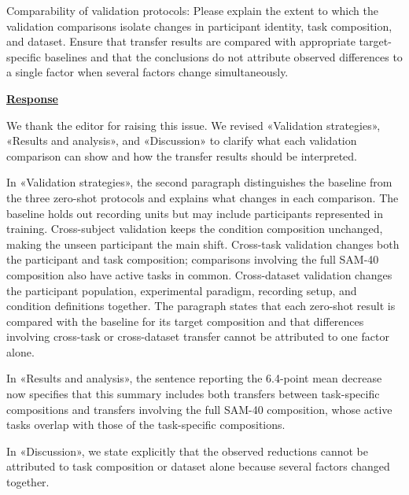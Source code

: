 \documentclass{article}
\begin{document}
\begin{cmt}{}{}

Comparability of validation protocols: Please explain the extent to which the
validation comparisons isolate changes in participant identity, task
composition, and dataset. Ensure that transfer results are compared with
appropriate target-specific baselines and that the conclusions do not attribute
observed differences to a single factor when several factors change
simultaneously.

\end{cmt}
\vspace{0.1cm}
\noindent
\underline{\textbf{Response}}
\vspace{0.2cm}

We thank the editor for raising this issue. We revised «Validation
strategies», «Results and analysis», and «Discussion» to clarify what each
validation comparison can show and how the transfer results should be
interpreted.

In «Validation strategies», the second paragraph distinguishes the
baseline from the three zero-shot protocols and explains what changes in each
comparison. The baseline holds out recording units but may include participants
represented in training. Cross-subject validation keeps the condition
composition unchanged, making the unseen participant the main shift. Cross-task
validation changes both the participant and task composition; comparisons
involving the full SAM-40 composition also have active tasks in common.
Cross-dataset validation changes the participant population, experimental
paradigm, recording setup, and condition definitions together. The paragraph
states that each zero-shot result is compared with the baseline for its target
composition and that differences involving cross-task or cross-dataset transfer
cannot be attributed to one factor alone.

In «Results and analysis», the sentence reporting the 6.4-point mean decrease now
specifies that this summary includes both transfers between task-specific
compositions and transfers involving the full SAM-40 composition, whose active
tasks overlap with those of the task-specific compositions.

In «Discussion», we state explicitly that the observed reductions cannot
be attributed to task composition or dataset alone because several factors
changed together.

\vspace{0.3cm}
\end{document}
